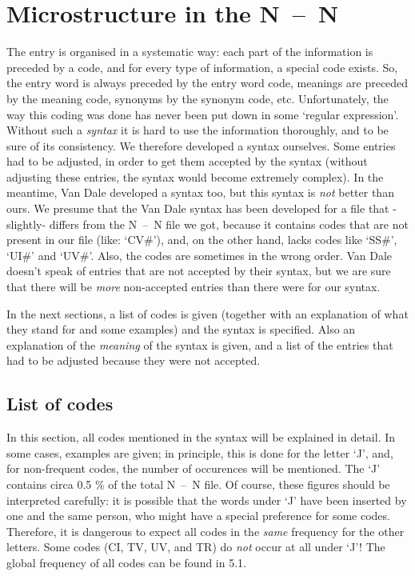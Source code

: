 \section{Microstructure in the N~--~N}
The entry is organised in a systematic way: each part of the information is
preceded by a code, and for every type of information, a special code exists.
So, the entry word is always preceded by the entry word code, meanings are
preceded by the meaning code, synonyms by the synonym code, etc. 
Unfortunately,
the way this coding was done has never been put down in some `regular 
expression'. Without such a {\em syntax} it is hard to use the information 
thoroughly, and to be sure of its consistency.
We therefore developed a syntax ourselves.
Some entries had to be adjusted, in order to get them accepted by the syntax 
(without adjusting these entries, the syntax would become extremely complex).
In the meantime, Van Dale developed a syntax too, but this syntax is {\em not}
better than ours.
We presume that
the Van Dale syntax has been developed for a file that -slightly- differs 
from the N~--~N file we got, because it contains codes that are not present in
our file (like: `CV\#'), and, on the other hand, lacks codes like `SS\#', 
`UI\#' and
`UV\#'. Also, the codes are sometimes in the wrong order. Van Dale doesn't
speak of entries that are not accepted by their syntax, but we are sure that 
there will be {\em more} non-accepted entries than there were for our syntax.

In the next sections, 
a list of codes is given (together with an explanation of 
what they stand for and some examples) and the syntax is specified. Also an 
explanation of the {\em meaning} of the syntax is given,
and a list of the entries that had to be adjusted because they were not
accepted. 
\subsection{List of codes}

In this section, all codes mentioned in the syntax will be explained in detail.
In some cases, examples are given; in principle, this is done for the letter 
`J', and, for non-frequent codes, the number of occurences will be mentioned.
The `J' contains circa 0.5 \% of the total N~--~N file.
Of course, these figures should be interpreted carefully: it is possible that 
the words under `J' have been inserted by one and the same person, who might
have a special preference for some codes. Therefore, it is dangerous to expect
all codes in the {\em same} frequency for the other letters. Some codes
(CI, TV, UV, and TR) do {\em not} occur at all under `J'! The global frequency 
of all codes can be found in 5.1.

